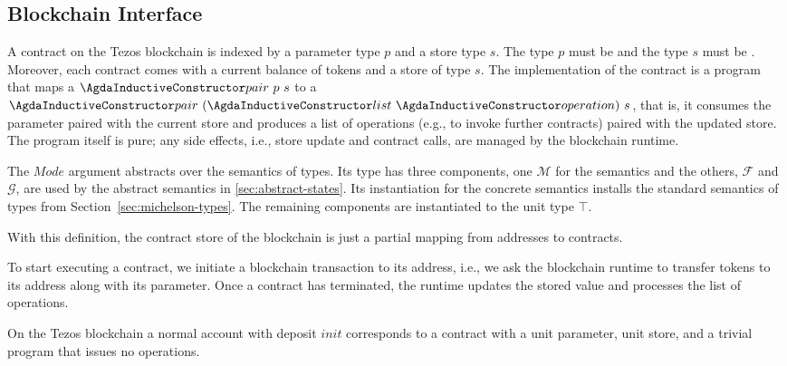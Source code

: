 \subsection{Blockchain Interface}
\label{sec:blockchain-interface}

A contract on the Tezos blockchain is indexed by a parameter type $p$
and a store type $s$. The type $p$ must be {\APassable} and the type
$s$ must be {\AStorable}. Moreover, each contract comes with a current
balance of tokens and a store of type $s$. The implementation of the
contract is a program that maps a $\ACon{pair}~p~s$ to a
$\ACon{pair}~(\ACon{list}~\Aoperation)~s$, that is, it consumes the
parameter paired with the current store and produces a list of operations (e.g., to invoke further
contracts) paired with the updated store. The program itself is pure;
any side effects, i.e., store update and contract calls, are managed
by the blockchain runtime.
\ConcreteContract

The $Mode$ argument abstracts over the semantics of types. Its type
has three components, one $\mathcal{M}$ for the semantics and the others,
$\mathcal{F}$ and $\mathcal{G}$, are used by the abstract semantics in \autoref{sec:abstract-states}.
\ConcreteMODE
Its instantiation for the concrete semantics installs the 
standard semantics of types from Section~\ref{sec:michelson-types}. The
remaining components are instantiated to the unit type $\top$.
\ConcreteCMode

With this definition, the contract store of the blockchain is just a partial mapping from addresses
to contracts.
\ConcreteBlockchain

To start executing a contract, we initiate a blockchain transaction to its
address, i.e., we ask the blockchain runtime to transfer tokens to its
address along with its parameter.
Once a contract has terminated, the runtime updates the
stored value and processes the list of operations.

On the Tezos blockchain a normal account with deposit $init$
corresponds to a
contract with a unit parameter, unit store, and a trivial program that issues no operations.
\ConcreteAccount



